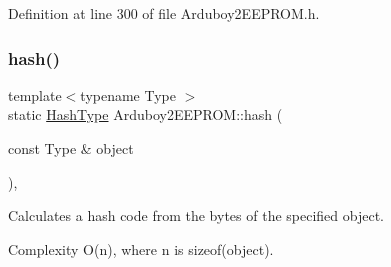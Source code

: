 Definition at line 300 of file Arduboy2\+E\+E\+P\+R\+O\+M.\+h.

\mbox{\label{classArduboy2EEPROM_a64c8b410796152924d0a334abac8fcfd}} 
\subsubsection{\texorpdfstring{hash()}{hash()}\hspace{0.1cm}{\footnotesize\ttfamily [2/2]}}
{\footnotesize\ttfamily template$<$typename Type $>$ \\
static \mbox{\hyperlink{classArduboy2EEPROM_a58f4ede0b1a6b773e269fd4604e489b7}{Hash\+Type}} Arduboy2\+E\+E\+P\+R\+O\+M\+::hash (\begin{DoxyParamCaption}\item[{const Type \&}]{object }\end{DoxyParamCaption})\hspace{0.3cm}{\ttfamily [inline]}, {\ttfamily [static]}}



Calculates a hash code from the bytes of the specified object. 

\begin{DoxyParagraph}{Complexity}
{\ttfamily O(n)}, where {\ttfamily n} is {\ttfamily sizeof(object)}.
\end{DoxyParagraph}


